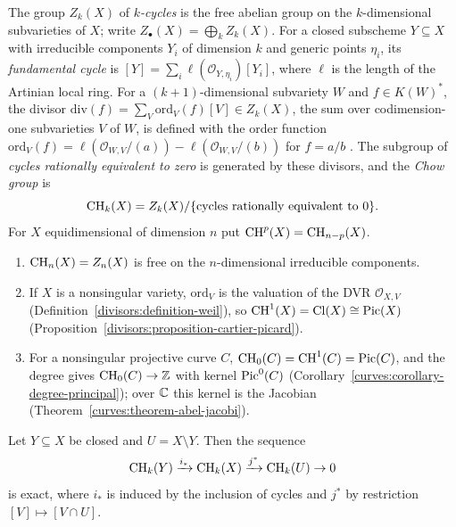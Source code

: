 \begin{definition}\label{intersection-theory:definition-cycles}
The group $Z_k(X)$ of \emph{$k$-cycles} is the free abelian group on the $k$-dimensional subvarieties of $X$; write $Z_\bullet(X) = \bigoplus_kZ_k(X)$. For a closed subscheme
$Y \subseteq X$ with irreducible components $Y_i$ of dimension $k$ and generic points $\eta_i$, its \emph{fundamental cycle} is $[Y] = \sum_i\ell(\mathcal{O}_{Y,\eta_i})[Y_i]$, where $\ell$ is
the length of the Artinian local ring. For a $(k+1)$-dimensional subvariety $W$ and $f \in K(W)^*$, the divisor $\mathrm{div}(f) = \sum_V\mathrm{ord}_V(f)[V] \in Z_k(X)$, the sum over
codimension-one subvarieties $V$ of $W$, is defined with the order function $\mathrm{ord}_V(f) = \ell(\mathcal{O}_{W,V}/(a)) - \ell(\mathcal{O}_{W,V}/(b))$ for $f = a/b$ \cite[Section 1.2]{fulton-intersection}.
The subgroup of \emph{cycles rationally equivalent to zero} is generated by these divisors, and the \emph{Chow group} is
\[
\operatorname{CH}_k(X) = Z_k(X)/\{\text{cycles rationally equivalent to } 0\}.
\]
For $X$ equidimensional of dimension $n$ put $\operatorname{CH}^p(X) = \operatorname{CH}_{n-p}(X)$.
\end{definition}

\begin{example}\label{intersection-theory:example-chow-first}
\begin{enumerate}
\item $\operatorname{CH}_n(X) = Z_n(X)$ is free on the $n$-dimensional irreducible components.
\item If $X$ is a nonsingular variety, $\mathrm{ord}_V$ is the valuation of the DVR $\mathcal{O}_{X,V}$ (Definition~\ref{divisors:definition-weil}), so
$\operatorname{CH}^1(X) = \mathrm{Cl}(X) \cong \operatorname{Pic}(X)$ (Proposition~\ref{divisors:proposition-cartier-picard}).
\item For a nonsingular projective curve $C$, $\operatorname{CH}_0(C) = \operatorname{CH}^1(C) = \operatorname{Pic}(C)$, and the degree gives $\operatorname{CH}_0(C) \to \mathbb{Z}$ with kernel $\operatorname{Pic}^0(C)$
(Corollary~\ref{curves:corollary-degree-principal}); over $\mathbb{C}$ this kernel is the Jacobian (Theorem~\ref{curves:theorem-abel-jacobi}).
\end{enumerate}
\end{example}

\begin{proposition}\label{intersection-theory:proposition-localisation}
Let $Y \subseteq X$ be closed and $U = X \setminus Y$. Then the sequence
\[
\operatorname{CH}_k(Y) \xrightarrow{i_*} \operatorname{CH}_k(X) \xrightarrow{j^*} \operatorname{CH}_k(U) \to 0
\]
is exact, where $i_*$ is induced by the inclusion of cycles and $j^*$ by restriction $[V] \mapsto [V \cap U]$.
\end{proposition}

